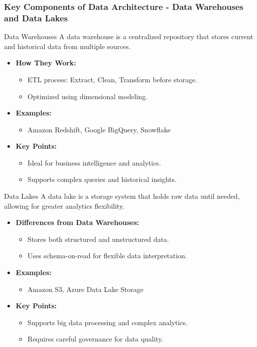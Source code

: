 \documentclass[aspectratio=169]{beamer}
\begin{document}
\begin{frame}[fragile]
    \frametitle{Key Components of Data Architecture - Data Warehouses and Data Lakes}
    \begin{block}{Data Warehouses}
        A data warehouse is a centralized repository that stores current and historical data from multiple sources.
    \end{block}
    \begin{itemize}
        \item \textbf{How They Work:}
        \begin{itemize}
            \item ETL process: Extract, Clean, Transform before storage.
            \item Optimized using dimensional modeling.
        \end{itemize}
        \item \textbf{Examples:}
        \begin{itemize}
            \item Amazon Redshift, Google BigQuery, Snowflake
        \end{itemize}
        \item \textbf{Key Points:}
        \begin{itemize}
            \item Ideal for business intelligence and analytics.
            \item Supports complex queries and historical insights.
        \end{itemize}
    \end{itemize}
    
    \begin{block}{Data Lakes}
        A data lake is a storage system that holds raw data until needed, allowing for greater analytics flexibility.
    \end{block}
    \begin{itemize}
        \item \textbf{Differences from Data Warehouses:}
        \begin{itemize}
            \item Stores both structured and unstructured data.
            \item Uses schema-on-read for flexible data interpretation.
        \end{itemize}
        \item \textbf{Examples:}
        \begin{itemize}
            \item Amazon S3, Azure Data Lake Storage
        \end{itemize}
        \item \textbf{Key Points:}
        \begin{itemize}
            \item Supports big data processing and complex analytics.
            \item Requires careful governance for data quality.
        \end{itemize}
    \end{itemize}
\end{frame}
\end{document}
